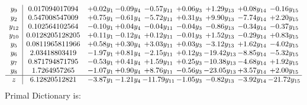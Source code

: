 \documentclass[9pt]{article}
\begin{document}
\[\begin{array}{c| c c@{\hskip 2pt} c@{\hskip 2pt} c@{\hskip 2pt} c@{\hskip 2pt} c@{\hskip 2pt} c@{\hskip 2pt} c@{\hskip 2pt} }
 y_{9}   &  0.017094017094 & +  0.02 y_{1} & -0.09 y_{4} & -0.57 y_{11} & +  0.06 y_{3} & +  1.29 y_{13} & +  0.08 y_{14} & -0.16 y_{15}\\
 y_{2}   &  0.547008547009 & +  0.75 y_{1} & -0.61 y_{4} & -5.72 y_{11} & +  0.31 y_{3} & +  9.90 y_{13} & -7.74 y_{14} & +  2.20 y_{15}\\
 y_{12}   &  0.102564102564 & -0.10 y_{1} & +  0.04 y_{4} & -0.04 y_{11} & -0.04 y_{3} & -0.86 y_{13} & -0.34 y_{14} & -0.37 y_{15}\\
 y_{10}   &  0.0128205128205 & +  0.11 y_{1} & -0.12 y_{4} & +  0.12 y_{11} & -0.01 y_{3} & +  1.52 y_{13} & -0.29 y_{14} & +  0.83 y_{15}\\
 y_{5}   &  0.0811965811966 & +  0.58 y_{1} & +  0.30 y_{4} & +  3.03 y_{11} & +  0.03 y_{3} & -3.12 y_{13} & +  1.62 y_{14} & -4.02 y_{15}\\
 y_{6}   &  2.03418803419 & -1.97 y_{1} & +  0.81 y_{4} & -2.15 y_{11} & +  0.12 y_{3} & -19.42 y_{13} & -8.85 y_{14} & -5.32 y_{15}\\
 y_{7}   &  0.871794871795 & -0.53 y_{1} & +  0.41 y_{4} & +  1.59 y_{11} & +  0.25 y_{3} & -10.38 y_{13} & -4.68 y_{14} & +  1.92 y_{15}\\
 y_{8}   &  1.7264957265 & -1.07 y_{1} & +  0.90 y_{4} & +  8.76 y_{11} & -0.56 y_{3} & -23.05 y_{13} & +  3.57 y_{14} & +  2.00 y_{15}\\
\hline
z    &  6.12820512821 & -3.87 y_{1} & -1.21 y_{4} & -11.79 y_{11} & -1.05 y_{3} & -0.82 y_{13} & -3.92 y_{14} & -21.72 y_{15}\\
\end{array}\]
Primal Dictionary is:
\end{document}
